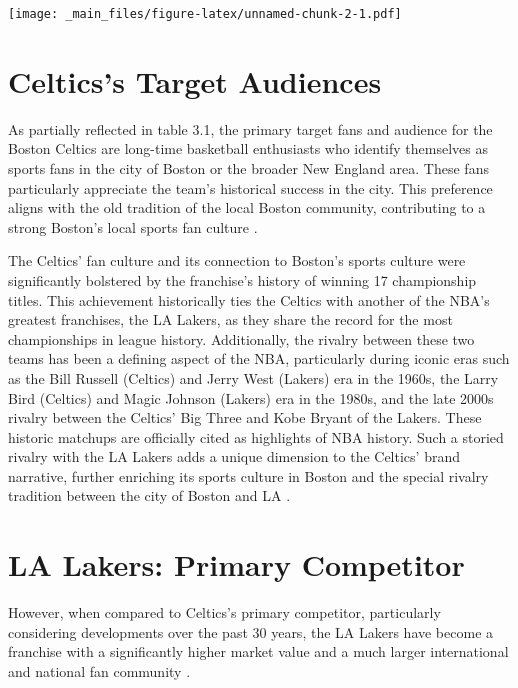 \documentclass[
]{book}
\begin{document}
\texttt{[image: \_main\_files/figure-latex/unnamed-chunk-2-1.pdf]}

\hypertarget{celticss-target-audiences}{%
\section{Celtics's Target Audiences}\label{celticss-target-audiences}}

As partially reflected in table 3.1, the primary target fans and audience for the Boston Celtics are long-time basketball enthusiasts who identify themselves as sports fans in the city of Boston or the broader New England area. These fans particularly appreciate the team's historical success in the city. This preference aligns with the old tradition of the local Boston community, contributing to a strong Boston's local sports fan culture \citep{olguin2022magnetismceltics}.

The Celtics' fan culture and its connection to Boston's sports culture were significantly bolstered by the franchise's history of winning 17 championship titles. This achievement historically ties the Celtics with another of the NBA's greatest franchises, the LA Lakers, as they share the record for the most championships in league history. Additionally, the rivalry between these two teams has been a defining aspect of the NBA, particularly during iconic eras such as the Bill Russell (Celtics) and Jerry West (Lakers) era in the 1960s, the Larry Bird (Celtics) and Magic Johnson (Lakers) era in the 1980s, and the late 2000s rivalry between the Celtics' Big Three and Kobe Bryant of the Lakers. These historic matchups are officially cited as highlights of NBA history. Such a storied rivalry with the LA Lakers adds a unique dimension to the Celtics' brand narrative, further enriching its sports culture in Boston and the special rivalry tradition between the city of Boston and LA \citep{talkbasket2022celticshistory}.

\hypertarget{la-lakers-primary-competitor}{%
\section{LA Lakers: Primary Competitor}\label{la-lakers-primary-competitor}}

However, when compared to Celtics's primary competitor, particularly considering developments over the past 30 years, the LA Lakers have become a franchise with a significantly higher market value and a much larger international and national fan community \citep[e.g.,][]{sam2023nba, skysports2021celticslakers}.
\end{document}
